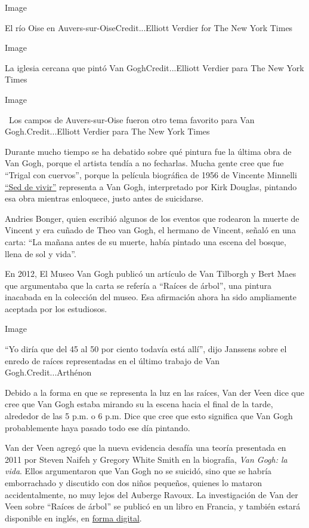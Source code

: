 Image

El río Oise en Auvers-sur-OiseCredit...Elliott Verdier for The New York
Times

Image

La iglesia cercana que pintó Van GoghCredit...Elliott Verdier para The
New York Times

Image

~Los campos de Auvers-sur-Oise fueron otro tema favorito para Van
Gogh.Credit...Elliott Verdier para The New York Times

Durante mucho tiempo se ha debatido sobre qué pintura fue la última obra
de Van Gogh, porque el artista tendía a no fecharlas. Mucha gente cree
que fue ``Trigal con cuervos'', porque la película biográfica de 1956 de
Vincente Minnelli \href{https://www.imdb.com/title/tt0049456/}{``Sed de
vivir''} representa a Van Gogh, interpretado por Kirk Douglas, pintando
esa obra mientras enloquece, justo antes de suicidarse.

Andries Bonger, quien escribió algunos de los eventos que rodearon la
muerte de Vincent y era cuñado de Theo van Gogh, el hermano de Vincent,
señaló en una carta: ``La mañana antes de su muerte, había pintado una
escena del bosque, llena de sol y vida''.

En 2012, El Museo Van Gogh publicó un artículo de Van Tilborgh y Bert
Maes que argumentaba que la carta se refería a ``Raíces de árbol'', una
pintura inacabada en la colección del museo. Esa afirmación ahora ha
sido ampliamente aceptada por los estudiosos.

Image

``Yo diría que del 45 al 50 por ciento todavía está allí'', dijo
Janssens sobre el enredo de raíces representadas en el último trabajo de
Van Gogh.Credit...Arthénon

Debido a la forma en que se representa la luz en las raíces, Van der
Veen dice que cree que Van Gogh estaba mirando su la escena hacia el
final de la tarde, alrededor de las 5 p.m. o 6 p.m. Dice que cree que
esto significa que Van Gogh probablemente haya pasado todo ese día
pintando.

Van der Veen agregó que la nueva evidencia desafía una teoría presentada
en 2011 por Steven Naifeh y Gregory White Smith en la biografía,
\emph{Van Gogh: la vida}. Ellos argumentaron que Van Gogh no se suicidó,
sino que se habría emborrachado y discutido con dos niños pequeños,
quienes lo mataron accidentalmente, no muy lejos del Auberge Ravoux. La
investigación de Van der Veen sobre ``Raíces de árbol'' se publicó en un
libro en Francia, y también estará disponible en inglés, en
\href{http://www.arthenon.com/roots}{forma digital}.

